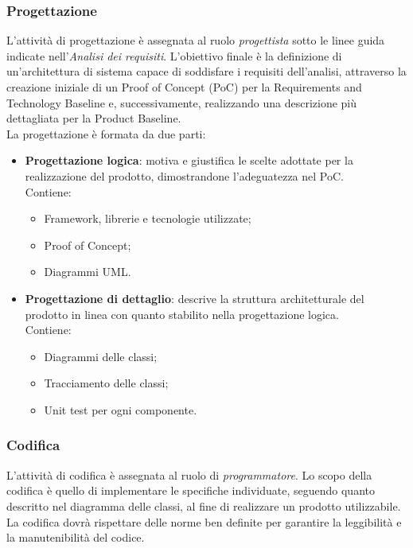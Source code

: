         \subsubsection{Progettazione}
        L'attività di progettazione è assegnata al ruolo \textit{progettista} sotto le linee guida indicate nell'\textit{Analisi dei requisiti}. L'obiettivo finale è la definizione di un'architettura di sistema capace di soddisfare i requisiti dell'analisi, 
        attraverso la creazione iniziale di un Proof of Concept (PoC) per la Requirements and Technology Baseline e, successivamente, realizzando una descrizione più dettagliata per la Product Baseline.
        \\La progettazione è formata da due parti:
        \begin{itemize}
            \item \textbf{Progettazione logica}: motiva e giustifica le scelte adottate per la realizzazione del prodotto, dimostrandone l’adeguatezza nel PoC.
            \\Contiene:
            \renewcommand{\labelitemii}{-}
            \begin{itemize}
                \item Framework, librerie e tecnologie utilizzate;
                \item Proof of Concept;
                \item Diagrammi UML.
            \end{itemize}
            \item \textbf{Progettazione di dettaglio}: descrive la struttura architetturale del prodotto in linea con quanto stabilito nella progettazione logica.\\
            Contiene:
            \renewcommand{\labelitemii}{-}
            \begin{itemize}
                \item Diagrammi delle classi;
                \item Tracciamento delle classi;
                \item Unit test per ogni componente.
            \end{itemize}
        \end{itemize}
        
        \subsubsection{Codifica}
        L'attività di codifica è assegnata al ruolo di \textit{programmatore}. Lo scopo della codifica è quello di implementare le specifiche individuate, seguendo quanto descritto nel diagramma delle classi, al fine di realizzare un prodotto utilizzabile.
        \\La codifica dovrà rispettare delle norme ben definite per garantire la leggibilità e la manutenibilità del codice.

